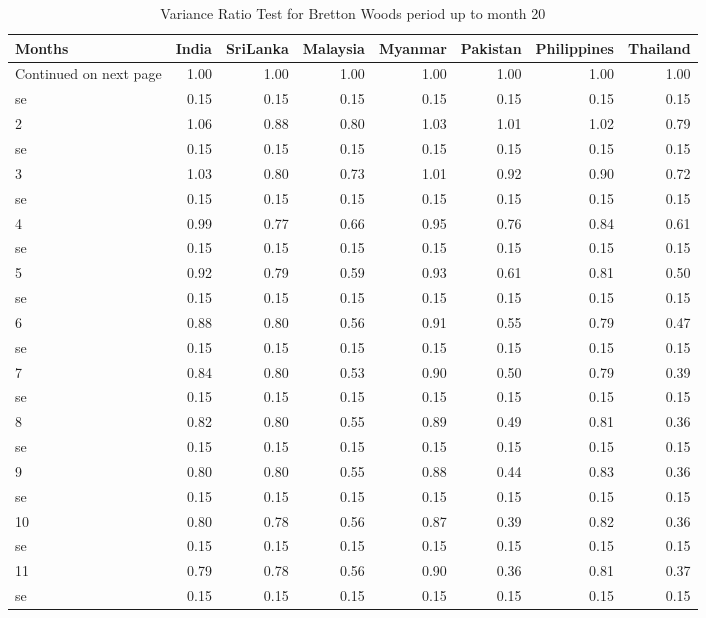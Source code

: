 \documentclass[11pt,preprint, authoryear]{elsarticle}
\numberwithin{equation}{section}
\numberwithin{figure}{section}
\numberwithin{table}{section}
\begin{document}
\begingroup\fontsize{12pt}{13pt}\selectfont
\begin{longtable}{lrrrrrrr}
\caption{Variance Ratio Test for Bretton Woods period up to month 20} \\ 
  \toprule
Months & India & SriLanka & Malaysia & Myanmar & Pakistan & Philippines & Thailand \\ 
  \hline 
\endhead 
\hline 
{\footnotesize Continued on next page} 
\endfoot 
\endlastfoot 
 \midrule
1 & 1.00 & 1.00 & 1.00 & 1.00 & 1.00 & 1.00 & 1.00 \\ 
  se & 0.15 & 0.15 & 0.15 & 0.15 & 0.15 & 0.15 & 0.15 \\ 
  2 & 1.06 & 0.88 & 0.80 & 1.03 & 1.01 & 1.02 & 0.79 \\ 
  se & 0.15 & 0.15 & 0.15 & 0.15 & 0.15 & 0.15 & 0.15 \\ 
  3 & 1.03 & 0.80 & 0.73 & 1.01 & 0.92 & 0.90 & 0.72 \\ 
  se & 0.15 & 0.15 & 0.15 & 0.15 & 0.15 & 0.15 & 0.15 \\ 
  4 & 0.99 & 0.77 & 0.66 & 0.95 & 0.76 & 0.84 & 0.61 \\ 
  se & 0.15 & 0.15 & 0.15 & 0.15 & 0.15 & 0.15 & 0.15 \\ 
  5 & 0.92 & 0.79 & 0.59 & 0.93 & 0.61 & 0.81 & 0.50 \\ 
  se & 0.15 & 0.15 & 0.15 & 0.15 & 0.15 & 0.15 & 0.15 \\ 
  6 & 0.88 & 0.80 & 0.56 & 0.91 & 0.55 & 0.79 & 0.47 \\ 
  se & 0.15 & 0.15 & 0.15 & 0.15 & 0.15 & 0.15 & 0.15 \\ 
  7 & 0.84 & 0.80 & 0.53 & 0.90 & 0.50 & 0.79 & 0.39 \\ 
  se & 0.15 & 0.15 & 0.15 & 0.15 & 0.15 & 0.15 & 0.15 \\ 
  8 & 0.82 & 0.80 & 0.55 & 0.89 & 0.49 & 0.81 & 0.36 \\ 
  se & 0.15 & 0.15 & 0.15 & 0.15 & 0.15 & 0.15 & 0.15 \\ 
  9 & 0.80 & 0.80 & 0.55 & 0.88 & 0.44 & 0.83 & 0.36 \\ 
  se & 0.15 & 0.15 & 0.15 & 0.15 & 0.15 & 0.15 & 0.15 \\ 
  10 & 0.80 & 0.78 & 0.56 & 0.87 & 0.39 & 0.82 & 0.36 \\ 
  se & 0.15 & 0.15 & 0.15 & 0.15 & 0.15 & 0.15 & 0.15 \\ 
  11 & 0.79 & 0.78 & 0.56 & 0.90 & 0.36 & 0.81 & 0.37 \\ 
  se & 0.15 & 0.15 & 0.15 & 0.15 & 0.15 & 0.15 & 0.15 \\ 

\end{longtable}
\end{document}
